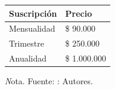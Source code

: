 \begin{adjustbox}{
            center,
            caption=[{Precios de suscripción.}]{Precios de suscripción mensual, trimestral y anual. },
            label={PrecioPeriodos},
            nofloat=table, vspace={20px}}
            {
            \begin{threeparttable}
           \begin{tabular}{|p{7.8cm}|p{7.8cm}|}
            \hline
            \rowcolor[HTML]{D9EAD3} 
            Suscripción & Precio       \\ \hline
            Mensualidad & \$ 90.000    \\ \hline
            Trimestre   & \$ 250.000   \\ \hline
            Anualidad   & \$ 1.000.000 \\ \hline
            \end{tabular}%
            
            \begin{tablenotes}
                \vspace{2mm}
                \textit Nota. Fuente: : Autores.
            \end{tablenotes}
            
        \end{threeparttable} 
    }        
            
\end{adjustbox}